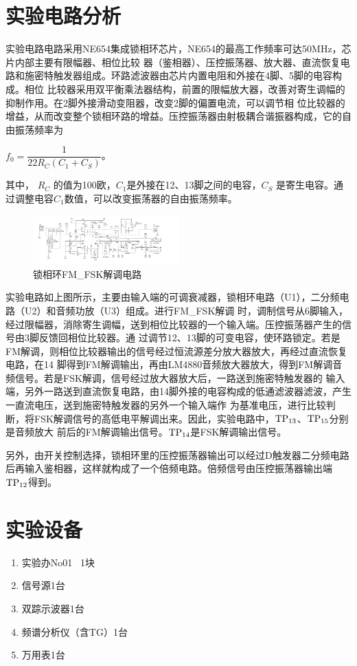 \documentclass{../source/Experiment}
\begin{document}
\section{实验电路分析}
实验电路电路采用NE654集成锁相环芯片，NE654的最高工作频率可达50MHz，芯片内部主要有限幅器、相位比较
器（鉴相器）、压控振荡器、放大器、直流恢复电路和施密特触发器组成。环路滤波器由芯片内置电阻和外接在4脚、5脚的电容构成。相位
比较器采用双平衡乘法器结构，前置的限幅放大器，改善对寄生调幅的抑制作用。在2脚外接滑动变阻器，改变2脚的偏置电流，可以调节相
位比较器的增益，从而改变整个锁相环路的增益。压控振荡器由射极耦合谐振器构成，它的自由振荡频率为

$f_0 = \dfrac{1}{22R_C(C_1 + C_S)}$。

其中， $R_C$ 的值为100欧，$C_1$是外接在12、13脚之间的电容，$C_S$ 是寄生电容。通过调整电容$C_1$数值，可以改变振荡器的自由振荡频率。

\begin{figure}[H]
    \centering
    \includegraphics[width = 0.5\textwidth]{lab4/1.png}
    \caption{锁相环FM\_FSK解调电路}
\end{figure}

实验电路如上图所示，主要由输入端的可调衰减器，锁相环电路（U1），二分频电路（U2）和音频功放（U3）组成。进行FM\_FSK解调
时，调制信号从6脚输入，经过限幅器，消除寄生调幅，送到相位比较器的一个输入端。压控振荡器产生的信号由3脚反馈回相位比较器。通
过调节12、13脚的可变电容，使环路锁定。若是FM解调，则相位比较器输出的信号经过恒流源差分放大器放大，再经过直流恢复电路，在14
脚得到FM解调输出，再由LM4880音频放大器放大，得到FM解调音频信号。若是FSK解调，信号经过放大器放大后，一路送到施密特触发器的
输入端，另外一路送到直流恢复电路，由14脚外接的电容构成的低通滤波器滤波，产生一直流电压，送到施密特触发器的另外一个输入端作
为基准电压，进行比较判断，将FSK解调信号的高低电平解调出来。因此，实验电路中，$\rm TP_{13}$、$\rm TP_{15}$分别是音频放大
前后的FM解调输出信号。$\rm TP_{14}$是FSK解调输出信号。

另外，由开关控制选择，锁相环里的压控振荡器输出可以经过D触发器二分频电路后再输入鉴相器，这样就构成了一个倍频电路。倍频信号由压控振荡器输出端$ \rm TP_{12}$得到。



\section{实验设备}
\begin{enumerate}
    \item 实验办No01 \, 1块
    \item 信号源1台
    \item 双踪示波器1台
    \item 频谱分析仪（含TG）1台
    \item 万用表1台
\end{enumerate}
\end{document}

